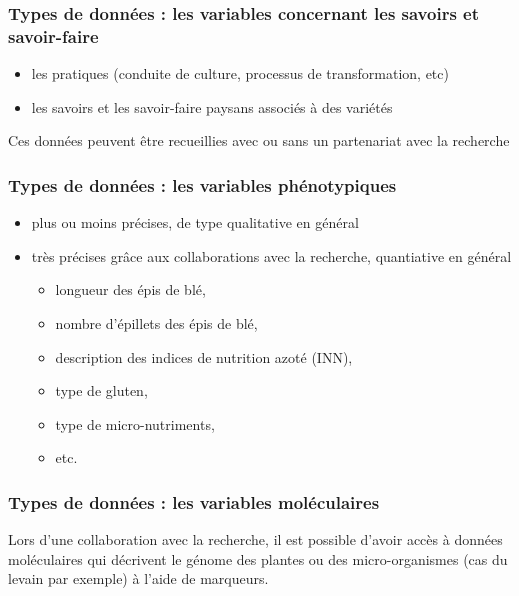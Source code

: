 \begin{frame}
\frametitle{Types de données : les variables concernant les savoirs et savoir-faire}

\begin{itemize}
\item les pratiques (conduite de culture, processus de transformation, etc)
\item les savoirs et les savoir-faire paysans associés à des variétés
\end{itemize}

\vfill

Ces données peuvent être recueillies avec ou sans un partenariat avec la recherche

\end{frame}



\begin{frame}
\frametitle{Types de données : les variables phénotypiques}

\begin{itemize}
\item plus ou moins précises, de type qualitative en général
\item très précises grâce aux collaborations avec la recherche, quantiative en général
	\begin{itemize}
	\item longueur des épis de blé, 
	\item nombre d'épillets des épis de blé, 
	\item description des indices de nutrition azoté (INN), 
	\item type de gluten, 
	\item type de micro-nutriments, 
	\item etc. 
	\end{itemize}

\end{itemize}

\end{frame}


\begin{frame}
\frametitle{Types de données : les variables moléculaires}

Lors d'une collaboration avec la recherche, il est possible d'avoir accès à données moléculaires qui décrivent le génome des plantes ou des micro-organismes (cas du levain par exemple) à l'aide de marqueurs.
\end{frame}


